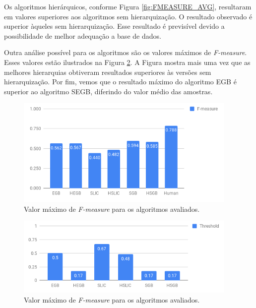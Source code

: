 \begin{document}
Os algoritmos hierárquicos, conforme Figura \ref{fig:FMEASURE_AVG}, resultaram em valores superiores aos algoritmos sem hierarquização. O resultado observado é superior àqueles sem hierarquização. Esse resultado é previsível devido a possibilidade de melhor adequação a base de dados.

Outra análise possível para os algoritmos são os valores máximos de \textit{F-measure}. Esses valores estão ilustrados na Figura \ref{fig:FMEASURE_MAX}. A Figura mostra mais uma vez que as melhores hierarquias obtiveram resultados superiores às versões sem hierarquização. Por fim, vemos que o resultado máximo do algoritmo EGB é superior ao algoritmo SEGB, diferindo do valor médio das amostras.

\begin{figure}[ht]
\centering
\includegraphics[width=0.95\textwidth]{graph_fmeasure.png}
\caption{Valor máximo de \textit{F-measure} para os algoritmos avaliados.}
\label{fig:FMEASURE_MAX}
\end{figure}

\begin{figure}[ht]
\centering
\includegraphics[width=0.95\textwidth]{graph_threshold.png}
\caption{Valor máximo de \textit{F-measure} para os algoritmos avaliados.}
\label{fig:FMEASURE_MAX}
\end{figure}

\end{document}
